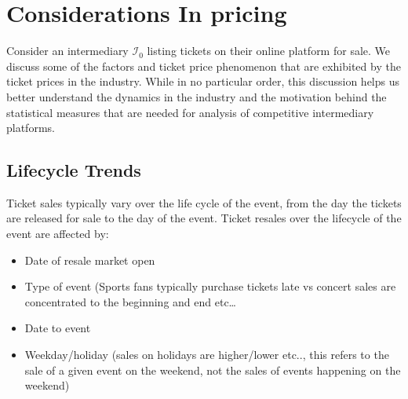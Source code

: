 \documentclass[letterpaper, 12pt]{article}
\begin{document}
\section{Considerations In pricing}\label{cip}
Consider an intermediary $\mathcal{I}_0$ listing tickets on their online platform for sale. We discuss some of the factors and ticket price phenomenon that are exhibited by the ticket prices in the industry. While in no particular order, this discussion helps us better understand the dynamics in the industry and the motivation behind the statistical measures that are needed for analysis of competitive intermediary platforms.
\subsection{Lifecycle Trends}\label{lctd}
Ticket sales typically vary over the life cycle of the event, from the day the tickets are released for sale to the day of the event. Ticket resales over the lifecycle of the event are affected by:
\begin{itemize}
	\item Date of resale market open
	\item Type of event (Sports fans typically purchase tickets late vs concert sales are concentrated to the beginning and end etc\dots
	\item Date to event 
	\item Weekday/holiday (sales on holidays are higher/lower etc.., this refers to the sale of a given event on the weekend, not the sales of events happening on the weekend)
\end{itemize}
\end{document}
